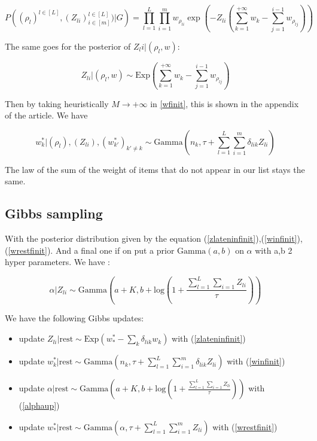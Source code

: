 \documentclass{article}
\begin{document}
\begin{equation}
    P\left( (\rho_l)^{l\in [L]},(Z_{li})_{i \in [m] }^{l \in [L]} ) \vert G\right) = \prod_{l=1}^L\prod_{i=1}^m w_{\rho_{li}} \exp \left( -Z_{li}\left(\sum_{k=1}^{+\infty} w_k-\sum_{j=1}^{i-1} w_{\rho_{lj}} \right) \right)
    \label{jointinfinit}
\end{equation}

The same goes for the posterior of $Z_li|(\rho_l,w)$:

\begin{equation}
    Z_{li}\vert (\rho_l,w) \sim \text{Exp}\left(\sum_{k=1}^{+\infty} w_k-\sum_{j=1}^{i-1} w_{\rho_{lj}} \right)
    \label{zlateninfinit}
\end{equation}

Then by taking heuristically $M \rightarrow +\infty$ in \ref{wfinit}, this is shown in the appendix of the article. We have 

\begin{equation}
w^*_k\vert (\rho_l),(Z_{li}),(w^*_{k'})_{k'\neq k} \sim \text{Gamma}\left(n_k,\tau +\sum_{l=1}^L\sum_{i=1}^m \delta_{lik}Z_{li}\right)
\label{winfinit}
\end{equation}

The law of the sum of the weight of items that do not appear in our list stays the same.

\subsection{Gibbs sampling}
With the posterior distribution given by the equation (\ref{zlateninfinit}),(\ref{winfinit}),(\ref{wrestfinit}). And a final one if on put a prior $\text{Gamma}(a,b)$ on $\alpha$ with a,b 2 hyper parameters. We have :

\begin{equation}
    \alpha \vert Z_{li} \sim \text{Gamma}\left(a+K , b + \text{log}\left(1 +\frac{\sum_{l=1}^L\sum_{i=1}Z_{li}}{\tau} \right) \right)
 \label{alphaup}  
\end{equation}

We have the following Gibbs updates: 
\begin{itemize}
    \item update $Z_{li}|\text{rest} \sim \text{Exp}\left(w^*_*-\sum_{k}\delta_{lik} w_k \right)$ with (\ref{zlateninfinit})
    \item update $w^*_k\vert \text{rest} \sim \text{Gamma}\left(n_k,\tau +\sum_{l=1}^L\sum_{i=1}^m \delta_{lik}Z_{li}\right)$ with (\ref{winfinit})
    \item update $\alpha \vert \text{rest} \sim \text{Gamma}\left(a+K , b + \text{log}\left(1 +\frac{\sum_{l=1}^L\sum_{i=1}Z_{li}}{\tau} \right) \right)$ with (\ref{alphaup})
    \item update $w^*_* |\text{rest} \sim \text{Gamma}\left(\alpha,\tau +\sum_{l=1}^L\sum_{i=1}^m Z_{li}\right)$ with (\ref{wrestfinit})
\end{itemize}
\end{document}
